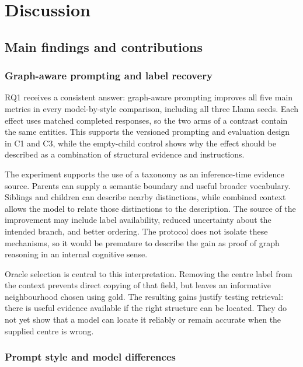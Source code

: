 \chapter{Discussion}

\FloatBarrier

\section{Main findings and contributions}

\subsection{Graph-aware prompting and label recovery}

RQ1 receives a consistent answer: graph-aware prompting improves all five main metrics in every model-by-style comparison, including all three Llama seeds. Each effect uses matched completed responses, so the two arms of a contrast contain the same entities. This supports the versioned prompting and evaluation design in C1 and C3, while the empty-child control shows why the effect should be described as a combination of structural evidence and instructions.


The experiment supports the use of a taxonomy as an inference-time evidence source. Parents can supply a semantic boundary and useful broader vocabulary. Siblings and children can describe nearby distinctions, while combined context allows the model to relate those distinctions to the description. The source of the improvement may include label availability, reduced uncertainty about the intended branch, and better ordering. The protocol does not isolate these mechanisms, so it would be premature to describe the gain as proof of graph reasoning in an internal cognitive sense.


Oracle selection is central to this interpretation. Removing the centre label from the context prevents direct copying of that field, but leaves an informative neighbourhood chosen using gold. The resulting gains justify testing retrieval: there is useful evidence available if the right structure can be located. They do not yet show that a model can locate it reliably or remain accurate when the supplied centre is wrong.


\subsection{Prompt style and model differences}

